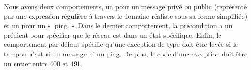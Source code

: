 %
Nous avons deux comportements, un pour un message privé ou public (représenté
par une expression régulière à travers le domaine réaliste  sous sa
forme simplifiée) et un pour un «~ping~». Dans le dernier comportement, la
précondition a un prédicat pour spécifier que le réseau est dans un état
spécifique. Enfin, le comportement par défaut spécifie qu'une exception de type
 doit être levée
si le tampon n'est ni un message ni un ping. De plus, le code d'une exception
doit être un entier entre 400 et 491.

